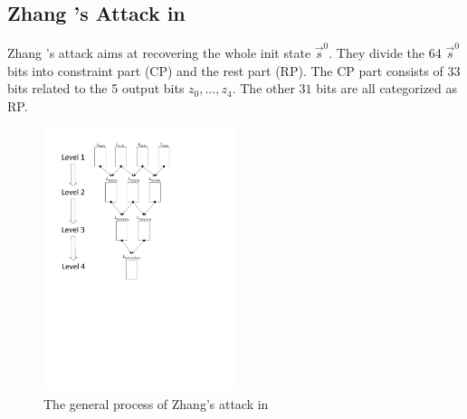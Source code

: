 \subsection{Zhang \etal's Attack in \cite{AC:Zhang19}}
Zhang \etal's attack aims at recovering the whole init state $\vec{s}^0$.
They divide the 64 $\vec{s}^0$ bits into constraint part (CP) and the rest part (RP).
The CP part consists of 33 bits related to the 5 output bits $z_0,\ldots, z_4$.
The other $31$ bits are all categorized as RP.

\begin{figure}[htbp]
  \centering
  \includegraphics[width=0.5\textwidth]{pic/MergeZhang.pdf}
  \caption{The general process of Zhang's attack in \cite{AC:Zhang19}}\label{fig:MergeZhang}
\end{figure}


